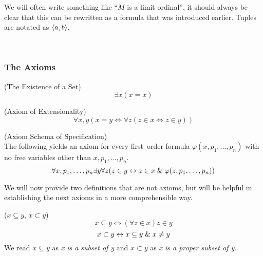 We will often write something like ``$M$ is a limit ordinal'', it should always be clear that this can be rewritten as a formula that was introduced earlier. Tuples are notated as $\langle a, b \rangle$.

\


\subsubsection{The Axioms}

\begin{definition}{(The Existence of a Set)}\label{def:existence_of_a_set}
\begin{equation}
\exists x (x = x)
\end{equation}
\end{definition}

\begin{definition}{(Axiom of Extensionality)}\label{def:extensionality}
\begin{equation}
\forall x, y (x = y \iff \forall z (z \in x \iff z \in y)) %
\end{equation}
\end{definition}

\begin{definition}{(Axiom Schema of Specification)}\label{def:specification}\\
The following yields an axiom for every first–order formula $\varphi(x, p_1, \ldots, p_n)$ with no free variables other than $x, p_1, \ldots, p_n$.
\begin{equation}
\forall x, p_1, \ldots, p_n \exists y \forall z ( z \in y \iff z \in x \et \varphi(z, p_1, \ldots, p_n)) %
\end{equation}
\end{definition}

We will now provide two definitions that are not axioms, but will be helpful in establishing the next axioms in a more comprehensible way.
\begin{definition}{($x \subseteq y$, $x \subset y$)}\label{def:subset}
\begin{equation}
x \subseteq y \iff (\forall z \in x) z \in y
\end{equation}
\begin{equation}
x \subset y \leftrightarrow x \subseteq y \mathrel{\&} x \neq y
\end{equation}
We read $x \subseteq y$ as \emph{x is a subset of y} and $x \subset y$ as \emph{x is a proper subset of y}.
\end{definition}

